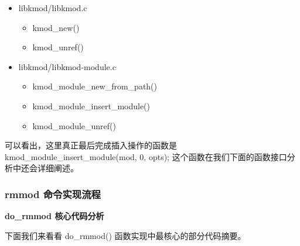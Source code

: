 \documentclass[11pt,a4paper]{article}
\begin{document}
\begin{itemize}
\item
  libkmod/libkmod.c
  \begin{itemize}
  \item
    kmod\_new()
  \item
    kmod\_unref()
  \end{itemize}
\item
  libkmod/libkmod-module.c
  \begin{itemize}
  \item
    kmod\_module\_new\_from\_path()
  \item
    kmod\_module\_insert\_module()
  \item
    kmod\_module\_unref()
  \end{itemize}
\end{itemize}
可以看出，这里真正最后完成插入操作的函数是
kmod\_module\_insert\_module(mod, 0, opts);
这个函数在我们下面的函数接口分析中还会详细阐述。

\subsubsection{rmmod 命令实现流程}

\textbf{do\_rmmod 核心代码分析}

下面我们来看看 do\_rmmod() 函数实现中最核心的部分代码摘要。
\end{document}
